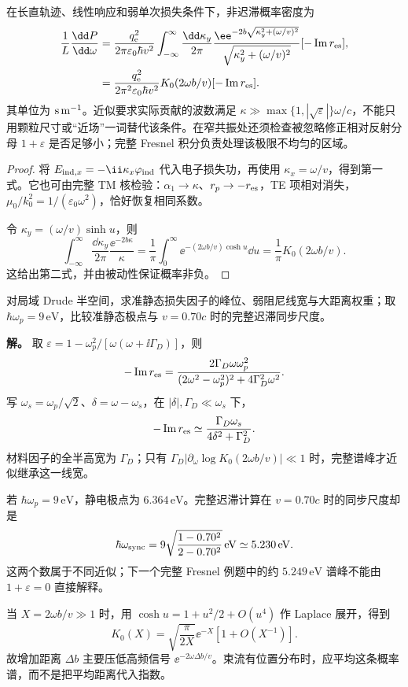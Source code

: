 \begin{theorem}[单位长度非迟滞损失谱]
在长直轨迹、线性响应和弱单次损失条件下，非迟滞概率密度为
\begin{align}
\frac1L\frac{\dd P}{\dd\omega}
&=\frac{q_{\mathrm e}^2}{2\pi\varepsilon_0\hbar v^2}
\int_{-\infty}^{\infty}\frac{\dd\kappa_y}{2\pi}
\frac{\ee^{-2b\sqrt{\kappa_y^2+(\omega/v)^2}}}
{\sqrt{\kappa_y^2+(\omega/v)^2}}
[-\operatorname{Im}r_{\rm es}],\label{eq:feqo-planar-eels}\\
&={\frac{q_{\mathrm e}^2}{2\pi^2\varepsilon_0\hbar v^2}
K_0(2\omega b/v)[-\operatorname{Im}r_{\rm es}].}
\label{eq:feqo-planar-eels-k0}
\end{align}
其单位为 ${\rm s\,m^{-1}}$。近似要求实际贡献的波数满足 $\kappa\gg\max\{1,|\sqrt\varepsilon|\}\omega/c$，不能只用颗粒尺寸或“近场”一词替代该条件。在窄共振处还须检查被忽略修正相对反射分母 $1+\varepsilon$ 是否足够小；完整 Fresnel 积分负责处理该极限不均匀的区域。
\end{theorem}
\begin{proof}
将 $E_{{\rm ind},x}=-\ii\kappa_x\varphi_{\rm ind}$ 代入电子损失功，再使用 $\kappa_x=\omega/v$，得到第一式。它也可由完整 TM 核检验：$\alpha_1\to\kappa$、$r_p\to-r_{\rm es}$，TE 项相对消失，$\mu_0/k_0^2=1/(\varepsilon_0\omega^2)$，恰好恢复相同系数。

令 $\kappa_y=(\omega/v)\sinh u$，则
\[
\int_{-\infty}^{\infty}\frac{\dd\kappa_y}{2\pi}
\frac{\ee^{-2b\kappa}}\kappa
=\frac1\pi\int_0^\infty\ee^{-(2\omega b/v)\cosh u}\dd u
=\frac1\pi K_0(2\omega b/v).
\]
这给出第二式，并由被动性保证概率非负。
\end{proof}

\begin{workedexample}
对局域 Drude 半空间，求准静态损失因子的峰位、弱阻尼线宽与大距离权重；取 $\hbar\omega_p=9\,\mathrm{eV}$，比较准静态极点与 $v=0.70c$ 时的完整迟滞同步尺度。

\textbf{解。} 取 $\varepsilon=1-\omega_p^2/[\omega(\omega+\ii\Gamma_D)]$，则
\[
-\operatorname{Im}r_{\rm es}
=\frac{2\Gamma_D\omega\omega_p^2}
{(2\omega^2-\omega_p^2)^2+4\Gamma_D^2\omega^2}.
\]
写 $\omega_s=\omega_p/\sqrt2$、$\delta=\omega-\omega_s$，在 $|\delta|,\Gamma_D\ll\omega_s$ 下，
\[
-\operatorname{Im}r_{\rm es}
\simeq\frac{\Gamma_D\omega_s}{4\delta^2+\Gamma_D^2}.
\]
材料因子的全半高宽为 $\Gamma_D$；只有 $\Gamma_D|\partial_\omega\log K_0(2\omega b/v)|\ll1$ 时，完整谱峰才近似继承这一线宽。

若 $\hbar\omega_p=9\,\mathrm{eV}$，静电极点为 $6.364\,\mathrm{eV}$。完整迟滞计算在 $v=0.70c$ 时的同步尺度却是
\[
\hbar\omega_{\rm sync}
=9\sqrt{\frac{1-0.70^2}{2-0.70^2}}\,\mathrm{eV}
\simeq5.230\,\mathrm{eV}.
\]
这两个数属于不同近似；下一个完整 Fresnel 例题中的约 $5.249\,\mathrm{eV}$ 谱峰不能由 $1+\varepsilon=0$ 直接解释。

当 $X=2\omega b/v\gg1$ 时，用 $\cosh u=1+u^2/2+O(u^4)$ 作 Laplace 展开，得到
\[
K_0(X)=\sqrt{\frac\pi{2X}}\ee^{-X}[1+O(X^{-1})].
\]
故增加距离 $\Delta b$ 主要压低高频信号 $\ee^{-2\omega\Delta b/v}$。束流有位置分布时，应平均这条概率谱，而不是把平均距离代入指数。
\end{workedexample}
